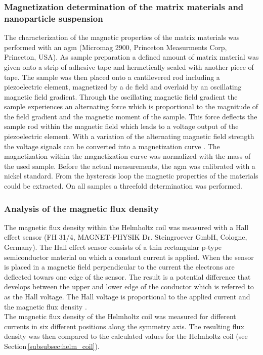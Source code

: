 \subsubsection{Magnetization determination of the matrix materials and nanoparticle suspension}
\label{subsubsec:Mag_char}
The characterization of the magnetic properties of the matrix materials was performed with an \gls{agm} (Micromag 2900, Princeton Measurments Corp, Princeton, USA). As sample preparation a defined amount of matrix material was given onto a strip of adhesive tape and hermetically sealed with another piece of tape. The sample was then placed onto a cantilevered rod including a piezoelectric element, magnetized by a dc field and overlaid by an oscillating magnetic field gradient. Through the  oscillating magnetic field gradient the sample experiences an alternating force  which is proportional to the magnitude of the field gradient and the magnetic moment of the sample. This force deflects the sample rod within the magnetic field which leads to a voltage output of the piezoelectric element. With a variation of the alternating magnetic field strength the voltage signals can be converted into a magnetization curve \cite{flanders1988alternating}. The magnetization within the magnetization curve was normalized with the mass of the used sample. Before the actual measurements, the \gls{agm} was calibrated with a nickel standard. From the hysteresis loop the magnetic properties of the materials could be extracted. On all samples a threefold determination was performed.    

\subsubsection{Analysis of the magnetic flux density}
\label{subsubsec:Hall_eff}
The magnetic flux density within the Helmholtz coil was measured with a Hall effect sensor (FH 31/4, MAGNET-PHYSIK Dr. Steingroever GmbH, Cologne, Germany). The Hall effect sensor consists of a thin rectangular p-type semiconductor material on which a constant current is applied. When the sensor is placed in a magnetic field perpendicular to the current the electrons are deflected towars one edge of the sensor. The result is a potential difference that develops between the upper and lower edge of the conductor which is referred to as the Hall voltage. The Hall voltage is proportional to the applied current and the magnetic flux density \cite{svoboda2004magnetic}.\\%
The magnetic flux density of the Helmholtz coil was measured for different currents in six different positions along the symmetry axis. The resulting flux density was then compared to the calculated values for the Helmholtz coil (see Section\,\ref{subsubsec:helm_coil}). 


